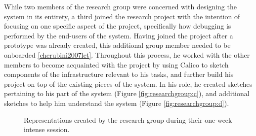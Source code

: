 %
%
%

While two members of the research group were concerned with designing the system in its entirety, a third joined the research project with the intention of focusing on one specific aspect of the project, specifically how debugging is performed by the end-users of the system. Having joined the project after a prototype was already created, this additional group member needed to be onboarded \ref{cherubini2007let}. Throughout this process, he worked with the other members to become acquainted with the project by using Calico to sketch components of the infrastructure relevant to his tasks, and further build his project on top of the existing pieces of the system. In his role, he created sketches pertaining to his part of the system (Figure \ref{fig:researchgroup:c}), and additional sketches to help him understand the system (Figure \ref{fig:researchgroup:d}).


\begin{figure}%
  \centering
   \caption {Representations created by the research group during their one-week intense session.}
   \label{fig:researchgroup:1}   
\end{figure}%

